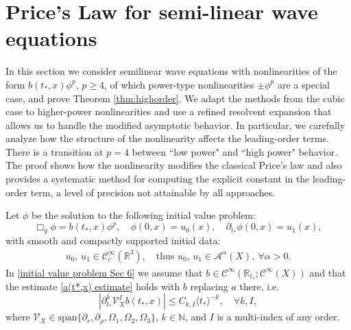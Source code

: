 \documentclass[10pt,a4paper,reqno]{amsart}
\newcommand{\CI}{\mathcal{C}^\infty}
\newcommand{\CcI}{\mathcal{C}_c^\infty}
\newcommand{\RR}{\mathbb{R}}
\newcommand{\NN}{\mathbb{N}}
\newcommand{\A}{\mathcal{A}}
\newcommand{\pa}{\partial}
\newcommand{\la}{\langle}
\newcommand{\ra}{\rangle}
\let\pminus\pm
\renewcommand{\pm}{\phi_{\le m}}
\theoremstyle{definition}
\theoremstyle{remark}
\numberwithin{equation}{section}
\newcommand{\ts}{t_*}
\begin{document}
\section{Price's Law for semi-linear wave equations}

In this section we consider semilinear wave equations with nonlinearities of the form $b(t_*,x)\phi^p$, $p\geq 4$, of which power-type nonlinearities $\pminus \phi^p$ are a special case, and prove Theorem \ref{thm:highorder}. 
We adapt the methods from the cubic case to higher-power nonlinearities and use a refined resolvent expansion that allows us to handle the modified asymptotic behavior. In particular, we carefully analyze how the structure of the nonlinearity affects the leading-order terms. There is a transition at $p=4$ between ``low power" and ``high power" behavior. The proof shows how the nonlinearity modifies the classical Price's law and also provides a systematic method for computing the explicit constant in the leading-order term, a level of precision not attainable by all approaches.


Let $\phi$ be the solution to the following initial value problem:
\begin{equation}
\label{initial value problem Sec 6}
\Box_g \phi = b(\ts,x)\phi^p,\quad \phi(0,x) = u_0(x),\quad \partial_{t_*}\phi(0,x) = u_1(x), 
\end{equation}
with smooth and compactly supported initial data:
\begin{equation}
\label{initial data finer assumption}
\begin{gathered}
    u_0, \,u_1 \in \CcI(\RR^3),\quad\text{thus }u_0,\,u_1\in\A^\alpha(X),\ \forall\alpha>0.
\end{gathered}
\end{equation}
In \eqref{initial value problem Sec 6} we assume that $b\in\CI(\RR_{\ts};\CI(X))$ and that the estimate \eqref{a(t*,x) estimate} holds with $b$ replacing $a$ there, i.e.
\begin{equation}
\label{b(t*,x) estimate}
    |\pa_{\ts}^k \mathcal{V}_X^I b(\ts,x)|\leq C_{k, I} \la \ts \ra^{-k},\quad\forall k,I,
\end{equation}
where $\mathcal{V}_X\in \mathrm{span}\{\pa_{r}, \pa_\rho, \Omega_1,\Omega_2,\Omega_3\}$, $k\in\NN$, and $I$ is a multi-index of any order.
\end{document}
